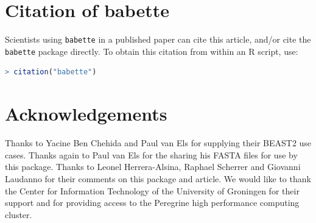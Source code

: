 \documentclass{article}
\begin{document}
\section{Citation of babette}

Scientists using \verb;babette; in a published paper can cite this
article, and/or cite the \verb;babette; package 
directly. To obtain this citation from within an R script, use:

\begin{lstlisting}[language=R]
> citation("babette")
\end{lstlisting}

\section{Acknowledgements}

Thanks to Yacine Ben Chehida and Paul van Els for supplying their 
BEAST2 use cases. Thanks again to Paul van Els for the sharing his FASTA files 
for use by this package. Thanks to Leonel Herrera-Alsina, Raphael Scherrer 
and Giovanni Laudanno for their comments on this package and article.
We would like to thank the Center for Information Technology of the University 
of Groningen for their support and for providing access to the Peregrine 
high performance computing cluster.



\end{document}

